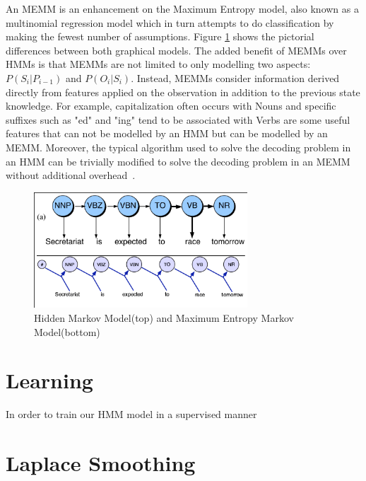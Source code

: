 \documentclass{acm_proc_article-sp}
\begin{document}
An MEMM is an enhancement on the Maximum Entropy model, also known as a multinomial regression model which in turn attempts to do classification by making the fewest number of assumptions. Figure \ref{hmmVmemm} shows the pictorial differences between both graphical models. The added benefit of MEMMs over HMMs is that MEMMs are not limited to only modelling two aspects: $P( S_i | P_{i-1} )$ and $P( O_i | S_i )$. Instead, MEMMs consider information derived directly from features applied on the observation in addition to the previous state knowledge. For example, capitalization often occurs with Nouns and specific suffixes such as "ed" and "ing" tend to be associated with Verbs are some useful features that can not be modelled by an HMM but can be modelled by an MEMM. Moreover, the typical algorithm used to solve the decoding problem in an HMM can be trivially modified to solve the decoding problem in an MEMM without additional overhead~\cite{nlpBook}.
\begin{figure}[ht]
\centering
\includegraphics[width=80mm]{figures/memm.png}
\caption{Hidden Markov Model(top) and Maximum Entropy Markov Model(bottom)~\cite{nlpBook} \label{hmmVmemm}}
\end{figure}

\section{Learning}
In order to train our HMM model in a supervised manner

\section{Laplace Smoothing}
\end{document}
